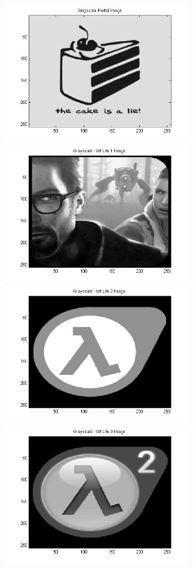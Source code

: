 \documentclass[11 pt]{article}
\begin{document}
\begin{center}
\includegraphics[width=3.2in]{Figure_1.jpg} \includegraphics[width=3.2in]{Figure_2.jpg}\\
\includegraphics[width=3.2in]{Figure_3.jpg} \includegraphics[width=3.2in]{Figure_4.jpg}
\end{center}
\end{document}
